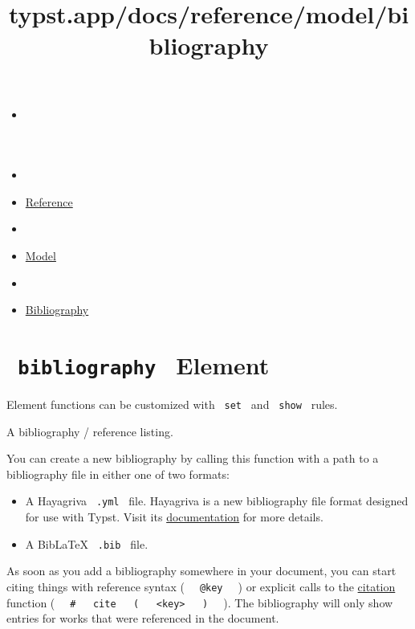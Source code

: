 \title{typst.app/docs/reference/model/bibliography}

\begin{itemize}
\tightlist
\item
  \href{/docs}{}
\item
  
\item
  \href{/docs/reference/}{Reference}
\item
  
\item
  \href{/docs/reference/model/}{Model}
\item
  
\item
  \href{/docs/reference/model/bibliography/}{Bibliography}
\end{itemize}

\section{\texorpdfstring{\texttt{\ bibliography\ } {{ Element
}}}{ bibliography   Element }}\label{summary}

\label{element-tooltip}
Element functions can be customized with \texttt{\ set\ } and
\texttt{\ show\ } rules.

A bibliography / reference listing.

You can create a new bibliography by calling this function with a path
to a bibliography file in either one of two formats:

\begin{itemize}
\tightlist
\item
  A Hayagriva \texttt{\ .yml\ } file. Hayagriva is a new bibliography
  file format designed for use with Typst. Visit its
  \href{https://github.com/typst/hayagriva/blob/main/docs/file-format.md}{documentation}
  for more details.
\item
  A BibLaTeX \texttt{\ .bib\ } file.
\end{itemize}

As soon as you add a bibliography somewhere in your document, you can
start citing things with reference syntax (
\texttt{\ }{\texttt{\ @key\ }}\texttt{\ } ) or explicit calls to the
\href{/docs/reference/model/cite/}{citation} function (
\texttt{\ }{\texttt{\ \#\ }}\texttt{\ }{\texttt{\ cite\ }}\texttt{\ }{\texttt{\ (\ }}\texttt{\ }{\texttt{\ \textless{}key\textgreater{}\ }}\texttt{\ }{\texttt{\ )\ }}\texttt{\ }
). The bibliography will only show entries for works that were
referenced in the document.

